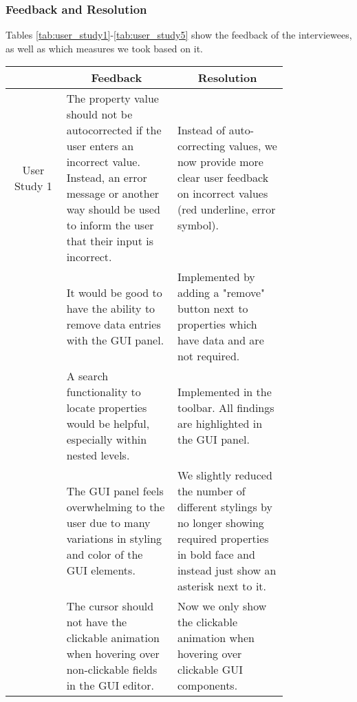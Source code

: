 \subsubsection{Feedback and Resolution} %
Tables \ref{tab:user_study1}-\ref{tab:user_study5} show the feedback of the interviewees, as well as which measures we took based on it.

\begin{table*}
    \vspace{-10pt}
    \centering
    \small %
    \setlength{\extrarowheight}{5pt} %
    \renewcommand{\arraystretch}{1.5} %
    \begin{tabular}{|c|p{0.4\linewidth}|p{0.4\linewidth}|}
        \hline
        \multicolumn{1}{|c|}{} & \multicolumn{1}{|c|}{Feedback} & \multicolumn{1}{|c|}{Resolution} \\
        \cline{2-3}
        \hline
        User Study 1 & The property value should not be autocorrected if the user enters an incorrect value.
        Instead, an error message or another way should be used to inform the user that their input is incorrect. &
        Instead of auto-correcting values, we now provide more clear user feedback on incorrect values (red underline, error symbol). \\
        \cline{2-3}
        & It would be good to have the ability to remove data entries with the GUI panel. &
        Implemented by adding a "remove" button next to properties which have data and are not required. \\
        \cline{2-3}
        & A search functionality to locate properties would be helpful, especially within nested levels.
        & Implemented in the toolbar. All findings are highlighted in the GUI panel. \\
        \cline{2-3}
        \cline{2-3}
        & The GUI panel feels overwhelming to the user due to many variations in styling and color of the GUI elements. &
        We slightly reduced the number of different stylings by no longer showing required properties in bold face and instead just show an asterisk next to it. \\
        \cline{2-3}
        & The cursor should not have the clickable animation when hovering over non-clickable fields in the GUI editor. & Now we only show the clickable animation when hovering over clickable GUI components. \\

\end{tabular}
\end{table*}
